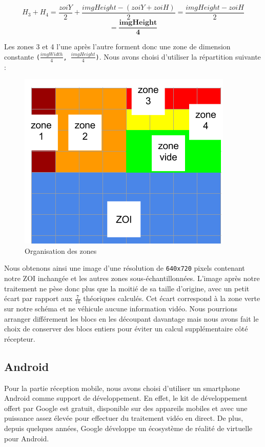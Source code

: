 \documentclass[11pt,a4paper]{article}
\begin{document}
$$ H_3 + H_4 = \frac{zoiY}{2} + \frac{imgHeight-(zoiY+zoiH)}{2} = \frac{imgHeight - zoiH}{2} $$
$$ = \mathbf{\frac{imgHeight}{4}} $$

Les zones 3 et 4 l'une après l'autre forment donc une zone de dimension constante \texttt{($\frac{imgWidth}{4}$, $\frac{imgHeight}{4}$)}.
Nous avons choisi d'utiliser la répartition suivante :

\begin{figure}[H]
\begin{center}
\includegraphics[scale=0.4]{images/decoupage2.png}
\end{center}
\caption{Organisation des zones}
\label{}
\end{figure}

\bigbreak
Nous obtenons ainsi une image d'une résolution de \texttt{640x720} pixels contenant notre ZOI inchangée et les autres zones sous-échantillonnées.
L'image après notre traitement ne pèse donc plus que la moitié de sa taille d'origine, avec un petit écart par rapport aux $\frac{7}{16}$ théoriques calculés.
Cet écart correspond à la zone verte sur notre schéma et ne véhicule aucune information vidéo.
Nous pourrions arranger différement les blocs en les découpant davantage mais nous avons fait le choix de conserver des blocs entiers pour éviter un calcul supplémentaire côté récepteur.

\subsection{Android}
Pour la partie réception mobile, nous avons choisi d'utiliser un smartphone Android comme support de développement.
En effet, le kit de développement offert par Google est gratuit, disponible sur des appareils mobiles et avec une puissance assez élevée pour effectuer du traitement vidéo en direct.
De plus, depuis quelques années, Google développe un écosystème de réalité de virtuelle pour Android.
\end{document}
